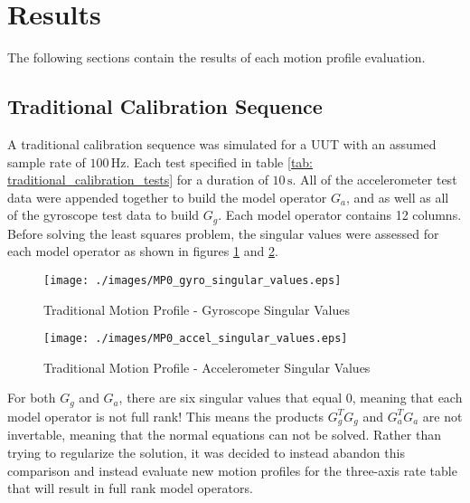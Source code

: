 
\begingroup
\allowdisplaybreaks

\section{Results}

The following sections contain the results of each motion profile evaluation.


\subsection{Traditional Calibration Sequence}

A traditional calibration sequence was simulated for a UUT with an assumed sample rate of $100 \,\unit{\hertz}$. Each test specified in table \ref{tab: traditional_calibration_tests} for a duration of $10 \,\unit{\second}$. All of the accelerometer test data were appended together to build the model operator $G_a$, and as well as all of the gyroscope test data to build $G_g$. Each model operator contains 12 columns. Before solving the least squares problem, the singular values were assessed for each model operator as shown in figures \ref{fig: MP0 gyro singular values} and \ref{fig: MP0 accel singular values}.

\begin{figure}[h] 
	\centering
	\texttt{[image: ./images/MP0\_gyro\_singular\_values.eps]}
	\caption{Traditional Motion Profile - Gyroscope Singular Values}
	\label{fig: MP0 gyro singular values}
\end{figure}
\FloatBarrier

\begin{figure}[h] 
	\centering
	\texttt{[image: ./images/MP0\_accel\_singular\_values.eps]}
	\caption{Traditional Motion Profile - Accelerometer Singular Values}
	\label{fig: MP0 accel singular values}
\end{figure}
\FloatBarrier

For both $G_g$ and $G_a$, there are six singular values that equal $0$, meaning that each model operator is not full rank! This means the products $G_g^T G_g$ and $G_a^T G_a$ are not invertable, meaning that the normal equations can not be solved. Rather than trying to regularize the solution, it was decided to instead abandon this comparison and instead evaluate new motion profiles for the three-axis rate table that will result in full rank model operators. 


